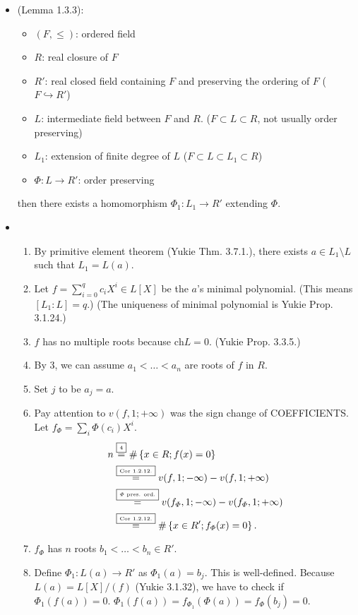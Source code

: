 \documentclass[9pt]{ltjsarticle}
\begin{document}
\begin{itemize}
  \item (Lemma 1.3.3):
  \begin{itemize}
    \item $(F,\le)$: ordered field
    \item $R$: real closure of $F$
    \item $R'$: real closed field containing $F$ and preserving the ordering of $F$
    ($F \hookrightarrow R'$)
    \item $L$: intermediate field between $F$ and $R$.
    ($F \subset L \subset R$, not usually order preserving)
    \item $L_1$: extension of finite degree of $L$
    ($F \subset L \subset L_1 \subset R$)
    \item $\varPhi \colon L\to R'$: order preserving
  \end{itemize}
  then there exists a homomorphism $\varPhi_1 \colon L_1 \to R'$ extending $\varPhi$.
  \item
  \pf
  \begin{enumerate}
    \item By primitive element theorem (Yukie Thm. 3.7.1.),
    there exists $a\in L_1 \setminus L$ such that $L_1 = L(a)$.
    \item
    Let $f = \sum_{i=0}^q c_i X^i \in L[X]$ be the $a$'s minimal polynomial.
    (This means $[L_1:L]=q$.)
    (The uniqueness of minimal polynomial is Yukie Prop. 3.1.24.)
    \item
    $f$ has no multiple roots because $\mathrm{ch} L =0 $.  (Yukie Prop. 3.3.5.)
    \item
    By 3, we can assume $a_1 < \dots < a_n$ are roots of $f$ in $R$.
    \item
    Set $j$ to be $a_j = a$.
    \item
    Pay attention to $v(f,1;+\infty)$ was the sign change of COEFFICIENTS.
    Let $f_\varPhi = \sum_i \varPhi(c_i)X^i$.
    \begin{align}
      n &\overset{\text{\fbox{\tiny 4}}}{=} \#\left\{x\in R; f(x)=0\right\}\\
      &\overset{\text{\fbox{\tiny Cor 1.2.12.}}}{=} v(f,1;-\infty) - v(f,1;+\infty)\\
      &\overset{\text{\fbox{\tiny $\varPhi$ pres. ord.}}}{=}
      v(f_\varPhi,1;-\infty) - v(f_\varPhi,1;+\infty)\\
      &\overset{\text{\fbox{\tiny Cor 1.2.12.}}}{=}
      \# \left\{x\in R'; f_\varPhi(x)=0\right\}.
    \end{align}
    \item
    $f_\varPhi$ has $n$ roots $b_1 < \dots < b_n \in R'$.
    \item
    Define $\varPhi_1\colon L(a)\to R'$ as $\varPhi_1(a) = b_j$.
    This is well-defined.  \pf
    Because $L(a) = L[X]/(f)$ (Yukie 3.1.32), we have to check if
    $\varPhi_1(f(a)) = 0$.  $\varPhi_1(f(a)) = f_{\varPhi_1}(\varPhi (a)) = f_\varPhi(b_j) = 0$.
  \end{enumerate}


\end{itemize}
\end{document}
